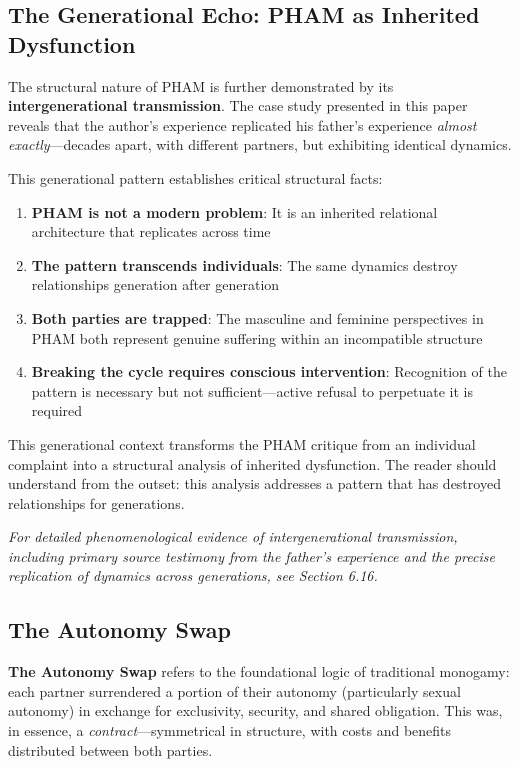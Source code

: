\documentclass[12pt, letterpaper]{article}
\begin{document}
\subsection{The Generational Echo: PHAM as Inherited Dysfunction}

The structural nature of PHAM is further demonstrated by its \textbf{intergenerational transmission}. The case study presented in this paper reveals that the author's experience replicated his father's experience \textit{almost exactly}---decades apart, with different partners, but exhibiting identical dynamics.

This generational pattern establishes critical structural facts:

\begin{enumerate}
    \item \textbf{PHAM is not a modern problem}: It is an inherited relational architecture that replicates across time
    \item \textbf{The pattern transcends individuals}: The same dynamics destroy relationships generation after generation
    \item \textbf{Both parties are trapped}: The masculine and feminine perspectives in PHAM both represent genuine suffering within an incompatible structure
    \item \textbf{Breaking the cycle requires conscious intervention}: Recognition of the pattern is necessary but not sufficient---active refusal to perpetuate it is required
\end{enumerate}

This generational context transforms the PHAM critique from an individual complaint into a structural analysis of inherited dysfunction. The reader should understand from the outset: this analysis addresses a pattern that has destroyed relationships for generations.

\textit{For detailed phenomenological evidence of intergenerational transmission, including primary source testimony from the father's experience and the precise replication of dynamics across generations, see Section 6.16.}

\subsection{The Autonomy Swap}

\textbf{The Autonomy Swap} refers to the foundational logic of traditional monogamy: each partner surrendered a portion of their autonomy (particularly sexual autonomy) in exchange for exclusivity, security, and shared obligation. This was, in essence, a \textit{contract}---symmetrical in structure, with costs and benefits distributed between both parties.
\end{document}
